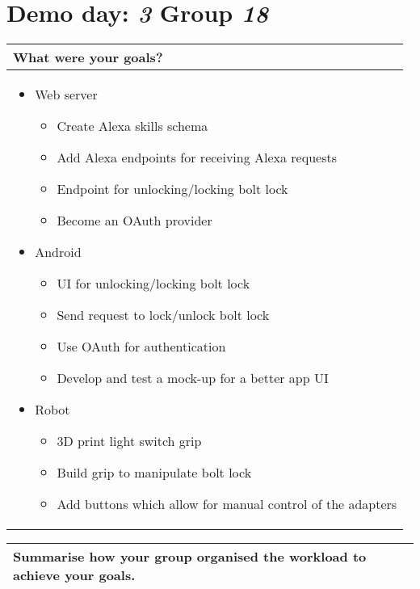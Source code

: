 \documentclass[a4paper]{article}
\newcommand{\colWidth}{141mm}
\begin{document}
 
\section*{Demo day: \textit{3} Group \textit{18}}


\begin{center}
\begin{tabular}{|p{\colWidth}|}
	\hline
	\cellcolor{blue!25}\large
	\textbf{What were your goals?}
	\\ \hline
	
	\begin{itemize}
		\item Web server 
		\begin{itemize}
			\item Create Alexa skills schema
			\item Add Alexa endpoints for receiving Alexa requests
			\item Endpoint for unlocking/locking bolt lock
			\item Become an OAuth provider
		\end{itemize}
		\item Android
		\begin{itemize}
			\item UI for unlocking/locking bolt lock
			\item Send request to lock/unlock bolt lock
			\item Use OAuth for authentication
			\item Develop and test a mock-up for a better app UI
		\end{itemize}
		\item Robot
		\begin{itemize}
			\item 3D print light switch grip
			\item Build grip to manipulate bolt lock
			\item Add buttons which allow for manual control of the adapters
		\end{itemize}
	\end{itemize}
	\\ \hline
\end{tabular}
\vskip 5mm


\begin{tabular}{|p{\colWidth}|}
	\hline
	\cellcolor{blue!25}\large
	\textbf{Summarise how your group organised the workload to achieve your goals.}
	\\ \hline
	

\end{tabular}
\end{center}
\end{document}
